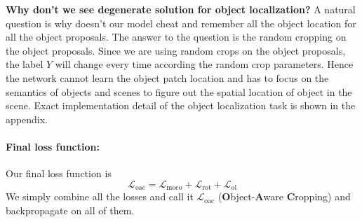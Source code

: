 \textbf{Why don't we see degenerate solution for object localization?} A natural question is why doesn't our model cheat and remember all the object location for all the object proposals. The answer to the question is the random cropping on the object proposals. Since we are using random crops on the object proposals, the label $Y$ will change every time according the random crop parameters.
Hence the network cannot learn the object patch location and has to focus on the semantics of objects and scenes to figure out the spatial location of object in the scene.  Exact implementation detail of the object localization task is shown in the appendix. 

\paragraph{Final loss function:}
Our final loss function is
\begin{equation}
\mathcal{L}_{\text{oac}} = \mathcal{L}_\text{moco} + \mathcal{L}_\text{rot} + \mathcal{L}_\text{ol}
\end{equation}
We simply combine all the losses and
call it $\mathcal{L}_{\text{oac}}$ (\textbf{O}bject-\textbf{A}ware \textbf{C}ropping)
and backpropagate on all of them. 









